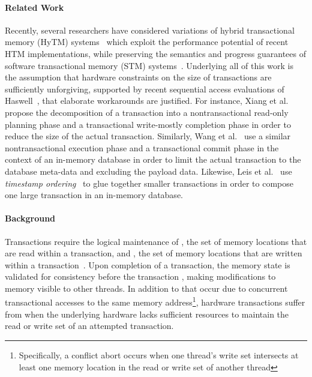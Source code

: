 \paragraph{Related Work}
Recently, several researchers have considered variations 
of hybrid transactional memory (HyTM) 
systems~\cite{DamronFeLe06,DalessandroSpSc10,MatveevSh15}
which exploit the performance potential of recent HTM
implementations, while preserving the semantics and
progress guarantees of software transactional memory (STM)
systems~\cite{ShavitTo95}.  Underlying
all of this work is the assumption that hardware constraints
on the size of transactions are sufficiently unforgiving, supported
by recent sequential access evaluations of Haswell~\cite{RitsonBa13,GoelTiNe14,PereiraGaAm14,DieguesRoRo14},
that elaborate workarounds are justified.  For instance, Xiang et 
al.~\cite{XiangSc15,XiangSc13} propose the decomposition of
a transaction into a nontransactional read-only 
planning phase and a transactional write-mostly 
completion phase in order to reduce the size of the
actual transaction.  Similarly, Wang et al.~\cite{WangQiLi14} 
use a similar nontransactional execution phase
and a transactional commit phase in the context
of an in-memory database in order to limit the
actual transaction to the database meta-data and 
excluding the payload data.
Likewise, Leis et al.~\cite{LeisKeNe14}
use \emph{timestamp ordering}~\cite{Carey83} to glue together
smaller transactions in order to compose one large
transaction in an in-memory database.  

\paragraph{Background}
Transactions require the logical 
maintenance of , the set
of memory locations that are read within a 
transaction, and , the set
of memory locations that are written within 
a transaction~\cite{HerlihyMo93}. Upon 
completion of a transaction, the memory state is validated for 
consistency before the transaction
, making modifications to memory 
visible to other threads.  In addition to 
that occur due to concurrent transactional accesses
to the same memory address\footnote{Specifically,
a conflict abort occurs when one thread's write set 
intersects at least one memory location in the 
read or write set of another thread}, hardware transactions suffer 
from  when the underlying hardware
lacks sufficient resources to maintain the
read or write set of an attempted transaction.


